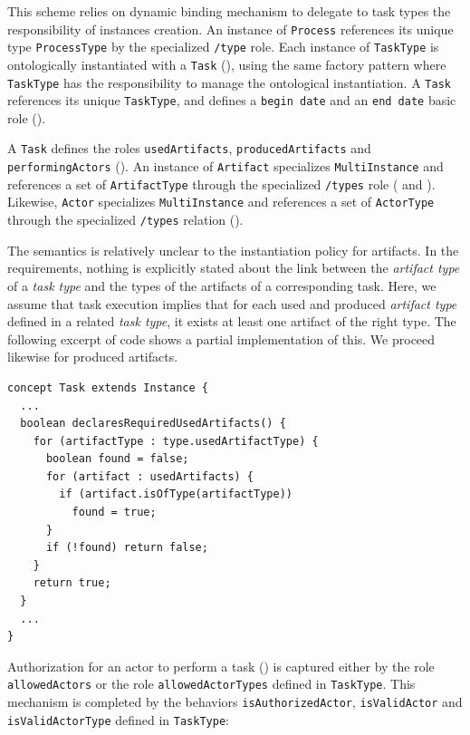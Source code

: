 This scheme relies on \FML dynamic binding mechanism to delegate to task types
the responsibility of instances creation. An instance of \texttt{Process}
references its unique type \texttt{ProcessType} by the specialized
\texttt{/type} role. Each instance of \texttt{TaskType} is ontologically
instantiated with a \texttt{Task} (), using the same factory
pattern where \texttt{TaskType} has the responsibility to manage the
ontological instantiation. A \texttt{Task} references its unique
\texttt{TaskType}, and defines a \texttt{begin date} and an \texttt{end date}
basic role ().

A \texttt{Task} defines the roles
\texttt{usedArtifacts}, \texttt{producedArtifacts} and
\texttt{performingActors}  (). An instance
of \texttt{Artifact} specializes \texttt{MultiInstance} and references a set of
\texttt{ArtifactType} through the specialized \texttt{/types} role
( and ). Likewise, \texttt{Actor} specializes
\texttt{MultiInstance} and references a set of \texttt{ActorType} through the
specialized \texttt{/types} relation ().

The semantics is relatively unclear to the instantiation policy for artifacts.
In the requirements, nothing is explicitly stated about the link between the
\emph{artifact type} of a \emph{task type} and the types of the artifacts of a
corresponding task.  Here, we assume that task execution implies that for each
used and produced \emph{artifact type} defined in a related \emph{task type},
it exists at least one artifact of the right type. The following excerpt of
\FML code shows a partial implementation of this. We proceed likewise for
produced artifacts.

\begin{lstlisting}
concept Task extends Instance {
  ...
  boolean declaresRequiredUsedArtifacts() {
    for (artifactType : type.usedArtifactType) {
      boolean found = false;
      for (artifact : usedArtifacts) {
        if (artifact.isOfType(artifactType))
          found = true;
      }
      if (!found) return false;
    }
    return true;
  }
  ...
}
\end{lstlisting}

Authorization for an actor to perform a task () is captured either
by the role \texttt{allowedActors} or the role \texttt{allowedActorTypes}
defined in \texttt{TaskType}. This mechanism is completed by the behaviors
\texttt{isAuthorizedActor}, \texttt{isValidActor} and \texttt{isValidActorType}
defined in \texttt{TaskType}:

